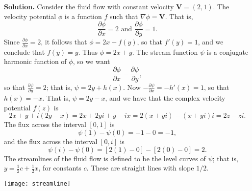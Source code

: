 \documentclass[9pt]{article}
\begin{document}
\begin{enumerate}
      \textbf{Solution.} Consider the fluid flow with constant velocity
      $\textbf{V} = (2, 1)$. The velocity potential $\phi$ is a function $f$
      such that $\nabla \phi = \textbf{V}$. That is,
      $$\frac{\partial \phi}{\partial x} = 2 \text{ and }
        \frac{\partial \phi}{\partial y} = 1.$$
      Since $\frac{\partial \phi}{\partial x} = 2$, it follows that
      $\phi = 2x + f(y)$, so that $f'(y) = 1$, and we conclude that
      $f(y) = y$. Thus $\phi = 2x + y$. The stream function $\psi$ is a
      conjugate harmonic function of $\phi$, so we want
      $$\frac{\partial \phi}{\partial x} = \frac{\partial \psi}{\partial y},$$
      so that $\frac{\partial \psi}{\partial y} = 2$; that is,
      $\psi = 2y + h(x)$. Now $-\frac{\partial \psi}{\partial x} = -h'(x) = 1$,
      so that $h(x) = -x$. That is, $\psi = 2y - x$, and we have that the
      complex velocity potential $f(z)$ is
      $$2x + y + i(2y - x) = 2x + 2yi + y - ix = 2(x + yi) - (x + yi)i = 2z - zi.$$
      The flux across the interval $[0, 1]$ is
      $$\psi(1) - \psi(0) = -1 - 0 = -1,$$
      and the flux across the interval $[0, i]$ is
      $$\psi(i) - \psi(0) = [2(1) - 0] - [2(0) - 0] = 2.$$
      The streamlines of the fluid flow is defined to be the level curves of
      $\psi$; that is, $y = \frac{1}{2}c + \frac{1}{2}x$, for constants $c$.
      These are straight lines with slope $1/2$.
      \begin{center}
      \texttt{[image: streamline]}
      \end{center}
\end{enumerate}
\end{document}
